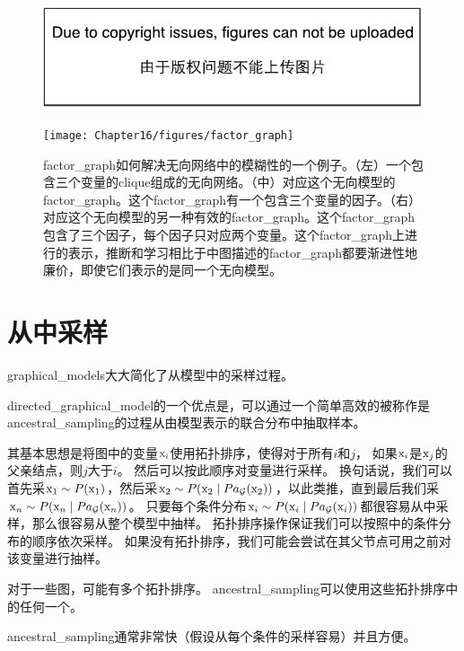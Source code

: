 \begin{figure}[!htb]
\ifOpenSource
\centerline{\includegraphics{figure.pdf}}
\else
	\centerline{\texttt{[image: Chapter16/figures/factor\_graph]}}	
\fi
	\caption{\gls{factor_graph}如何解决无向网络中的模糊性的一个例子。（左）一个包含三个变量的\gls{clique}组成的无向网络。（中）对应这个无向模型的\gls{factor_graph}。这个\gls{factor_graph}有一个包含三个变量的因子。（右）对应这个无向模型的另一种有效的\gls{factor_graph}。这个\gls{factor_graph}包含了三个因子，每个因子只对应两个变量。这个\gls{factor_graph}上进行的表示，推断和学习相比于中图描述的\gls{factor_graph}都要渐进性地廉价，即使它们表示的是同一个无向模型。}
	\label{fig:factor_graph}
\end{figure}


\section{从中采样}
\label{sec:sampling_from_graphical_models}

\gls{graphical_models}大大简化了从模型中的采样过程。


\gls{directed_graphical_model}的一个优点是，可以通过一个简单高效的被称作是\gls{ancestral_sampling}的过程从由模型表示的联合分布中抽取样本。


其基本思想是将图中的变量$\mathrm{x}_i$使用拓扑排序，使得对于所有$i$和$j$，
如果$\mathrm{x}_i$是$\mathrm{x}_j$的父亲结点，则$j$大于$i$。
然后可以按此顺序对变量进行采样。
换句话说，我们可以首先采$\mathrm{x}_1\sim P(\mathrm{x}_1)$，然后采$\mathrm{x}_2\sim P(\mathrm{x}_2\mid Pa_{\mathcal{G}}(\mathrm{x}_2))$，以此类推，直到最后我们采$\mathrm{x}_n\sim P(\mathrm{x}_n\mid Pa_{\mathcal{G}}(\mathrm{x}_n))$。
只要每个条件分布$\mathrm{x}_i\sim P(\mathrm{x}_i\mid Pa_{\mathcal{G}}(\mathrm{x}_i))$都很容易从中采样，那么很容易从整个模型中抽样。
拓扑排序操作保证我们可以按照中的条件分布的顺序依次采样。
如果没有拓扑排序，我们可能会尝试在其父节点可用之前对该变量进行抽样。


对于一些图，可能有多个拓扑排序。 
\gls{ancestral_sampling}可以使用这些拓扑排序中的任何一个。

\gls{ancestral_sampling}通常非常快（假设从每个条件的采样容易）并且方便。


